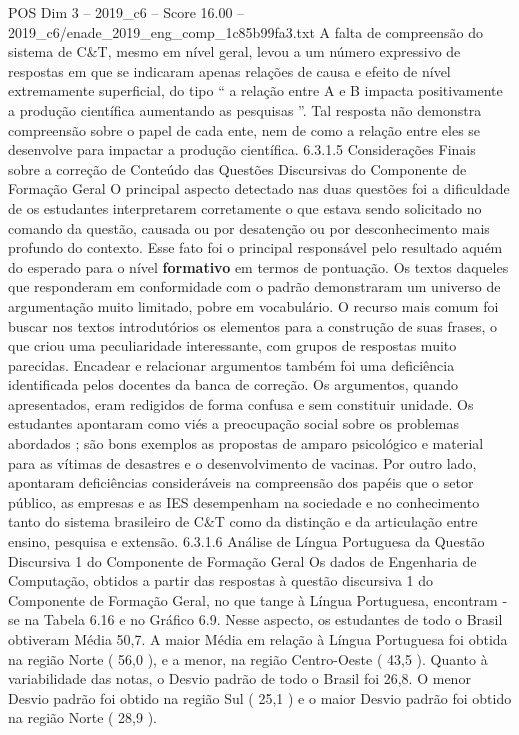 \begin{textsample}{POS Dim 3 – 2019\_c6 – Score 16.00 – 2019\_c6/enade\_2019\_eng\_comp\_1c85b99fa3.txt}
A falta de compreensão do sistema de C\&T, mesmo em nível geral, levou a um número expressivo de respostas em que se indicaram apenas relações de causa e efeito de nível extremamente superficial, do tipo “ a relação entre A e B impacta positivamente a produção científica aumentando as pesquisas ”.
Tal resposta não demonstra compreensão sobre o papel de cada ente, nem de como a relação entre eles se desenvolve para impactar a produção científica. 6.3.1.5 Considerações Finais sobre a correção de Conteúdo das Questões Discursivas do Componente de Formação Geral O principal aspecto detectado nas duas questões foi a dificuldade de os estudantes interpretarem corretamente o que estava sendo solicitado no comando da questão, causada ou por desatenção ou por desconhecimento mais profundo do contexto.
Esse fato foi o principal responsável pelo resultado aquém do esperado para o nível \textbf{formativo} em termos de pontuação.
Os textos daqueles que responderam em conformidade com o padrão demonstraram um universo de argumentação muito limitado, pobre em vocabulário.
O recurso mais comum foi buscar nos textos introdutórios os elementos para a construção de suas frases, o que criou uma peculiaridade interessante, com grupos de respostas muito parecidas.
Encadear e relacionar argumentos também foi uma deficiência identificada pelos docentes da banca de correção.
Os argumentos, quando apresentados, eram redigidos de forma confusa e sem constituir unidade.
Os estudantes apontaram como viés a preocupação social sobre os problemas abordados ; são bons exemplos as propostas de amparo psicológico e material para as vítimas de desastres e o desenvolvimento de vacinas.
Por outro lado, apontaram deficiências consideráveis na compreensão dos papéis que o setor público, as empresas e as IES desempenham na sociedade e no conhecimento tanto do sistema brasileiro de C\&T como da distinção e da articulação entre ensino, pesquisa e extensão. 6.3.1.6 Análise de Língua Portuguesa da Questão Discursiva 1 do Componente de Formação Geral Os dados de Engenharia de Computação, obtidos a partir das respostas à questão discursiva 1 do Componente de Formação Geral, no que tange à Língua Portuguesa, encontram -se na Tabela 6.16 e no Gráfico 6.9.
Nesse aspecto, os estudantes de todo o Brasil obtiveram Média 50,7.
A maior Média em relação à Língua Portuguesa foi obtida na região Norte ( 56,0 ), e a menor, na região Centro-Oeste ( 43,5 ).
Quanto à variabilidade das notas, o Desvio padrão de todo o Brasil foi 26,8.
O menor Desvio padrão foi obtido na região Sul ( 25,1 ) e o maior Desvio padrão foi obtido na região Norte ( 28,9 ).

\end{textsample}

